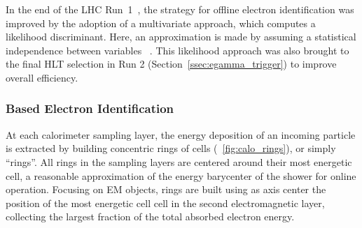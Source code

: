 In the end of the LHC Run~1~\cite{PERF-2016-01}, the strategy for offline electron identification was improved by the adoption of a multivariate approach, which computes a likelihood discriminant. Here, an approximation is made by assuming a statistical independence between variables ~\cite{kendalls_vol2b}. This likelihood approach was also brought to the final HLT selection in Run 2 (Section~\ref{ssec:egamma_trigger}) to improve overall efficiency. 


\newpage

\subsubsection{\rnn{} Based Electron Identification}%

At each calorimeter sampling layer, the energy deposition of an incoming particle is extracted by building concentric rings of cells (\figurename~\ref{fig:calo_rings}), or simply ``rings''. All rings in the \ecal sampling layers are
centered around their most energetic cell, a reasonable
approximation of the energy barycenter of the shower for online
operation. Focusing on EM objects, rings are built using as axis center the position of the most energetic cell cell in the second electromagnetic layer, collecting the largest fraction of the total absorbed electron energy.


